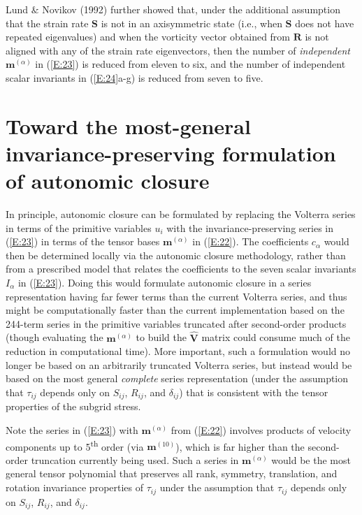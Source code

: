 Lund $\&$ Novikov (1992) further showed that, under the additional assumption that the strain rate $\mathbf{S}$ is not in an axisymmetric state (i.e., when $\mathbf{S}$ does not have repeated eigenvalues) and when the vorticity vector obtained from $\mathbf{R}$ is not aligned with any of the strain rate eigenvectors, then the number of \textit{independent} $\mathbf{m}^{(\alpha)}$ in (\ref{E:23}) is reduced from eleven to six, and the number of independent scalar invariants in (\ref{E:24}a-g) is reduced from seven to five. 


\section{Toward the most-general invariance-preserving formulation of autonomic closure} 
\label{sec:1B}

In principle, autonomic closure can be formulated by replacing the Volterra series in terms of the primitive variables $u_i$  with the invariance-preserving series in (\ref{E:23}) in terms of the tensor bases $\mathbf{m}^{(\alpha)}$  in (\ref{E:22}). The coefficients $c_{\alpha}$  would then be determined locally via the autonomic closure methodology, rather than from a prescribed model that relates the coefficients to the seven scalar invariants $I_{\alpha}$ in (\ref{E:23}). Doing this would formulate autonomic closure in a series representation having far fewer terms than the current Volterra series, and thus might be computationally faster than the current implementation based on the 244-term series in the primitive variables truncated after second-order products (though evaluating the  $\mathbf{m}^{(\alpha)}$  to build the $\mathbf{\widehat{V}}$  matrix could consume much of the reduction in computational time). More important, such a formulation would no longer be based on an arbitrarily truncated Volterra series, but instead would be based on the most general \textit{complete} series representation (under the assumption that $\tau_{ij}$  depends only on $S_{ij}$, $R_{ij}$, and $\delta_{ij}$) that is consistent with the tensor properties of the subgrid stress. 

Note the series in (\ref{E:23}) with  $\mathbf{m}^{(\alpha)}$ from (\ref{E:22}) involves products of velocity components up to 5\textsuperscript{th} order (via $\mathbf{m}^{(10)}$), which is far higher than the second-order truncation currently being used. Such a series in  $\mathbf{m}^{(\alpha)}$ would be the most general tensor polynomial that preserves all rank, symmetry, translation, and rotation invariance properties of  $\tau_{ij}$ under the assumption that  $\tau_{ij}$ depends only on $S_{ij}$, $R_{ij}$, and $\delta_{ij}$.

